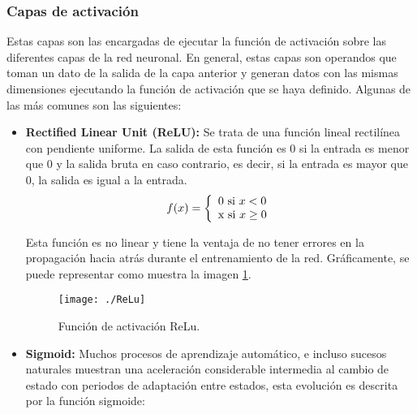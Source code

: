 \documentclass[a4paper, 12pt, spanish, chapterprefix, numbers=noenddot]{book}
\begin{document}
\subsubsection{Capas de activación}\label{CapasActivacion}

Estas capas son las encargadas de ejecutar la función de activación sobre las diferentes capas de la red neuronal. En general, estas capas son operandos que toman un dato de la salida de la capa anterior y generan datos con las mismas dimensiones ejecutando la función de activación que se haya definido. Algunas de las más comunes son las siguientes:

\begin{itemize}
\item \textbf{Rectified Linear Unit (ReLU):} Se trata de una función lineal rectilínea con pendiente uniforme. La salida de esta función es 0 si la entrada es menor que 0 y la salida bruta en caso contrario, es decir, si la entrada es mayor que 0, la salida es igual a la entrada.
\begin{equation}
f(x) = \left\lbrace
\begin{array}{ll}
\textup{0 si } x<0\\
\textup{x si } x\geq 0
\end{array}
\right.
\end{equation}

Esta función es no linear y tiene la ventaja de no tener errores en la propagación hacia atrás durante el entrenamiento de la red. Gráficamente, se puede representar como muestra la imagen \ref{ReLu}.

\begin{figure}[H]
\begin{center}
\texttt{[image: ./ReLu]}
\caption{Función de activación ReLu.}
\label{ReLu}
\end{center}
\end{figure}

\begin{comment}
\item \textbf{PReLU}
\item \textbf{ELU}
\end{comment}

\item \textbf{Sigmoid:} Muchos procesos de aprendizaje automático, e incluso sucesos naturales muestran una aceleración considerable intermedia al cambio de estado con periodos de adaptación entre estados, esta evolución es descrita por la función sigmoide:


\end{itemize}
\end{document}
